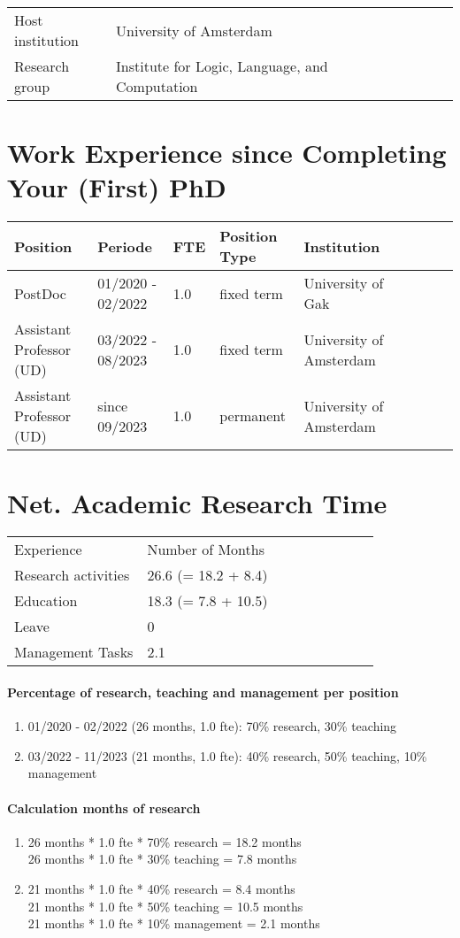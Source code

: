 \documentclass[a4paper,9.5pt,fleqn]{application}
\begin{document}
\begin{tabular}{lllllllll}
Host institution& University of Amsterdam\\
Research group& Institute for Logic, Language, and Computation
\end{tabular}

\section{Work Experience since Completing Your (First) PhD}

\begin{tabular}{lllllllll}
Position & Periode & FTE & Position Type & Institution\\ \hline
PostDoc & 01/2020 - 02/2022 & 1.0 & fixed term & University of Gak\\
Assistant Professor (UD) & 03/2022 - 08/2023 & 1.0 & fixed term & University of Amsterdam\\
Assistant Professor (UD) & since 09/2023 & 1.0 & permanent & University of Amsterdam
\end{tabular}


\section{Net. Academic Research Time}
\begin{tabular}{lllllllll}
Experience& Number of Months\\
Research activities & 26.6 (= 18.2 + 8.4)\\
Education & 18.3 (= 7.8 + 10.5)\\
Leave & 0 \\
Management Tasks & 2.1 \\
\end{tabular}

\paragraph{Percentage of research, teaching and management per position}
\begin{enumerate}
	\item 01/2020 - 02/2022 (26 months, 1.0 fte): 70\% research, 30\% teaching
	\item 03/2022 - 11/2023 (21 months, 1.0 fte): 40\% research, 50\% teaching, 10\% management
\end{enumerate}

\paragraph{Calculation months of research}
\begin{enumerate}
	\item 26 months * 1.0 fte * 70\% research = 18.2 months\\ 
	      26 months * 1.0 fte * 30\% teaching = 7.8 months
	\item 21 months * 1.0 fte * 40\% research = 8.4 months\\
	      21 months * 1.0 fte * 50\% teaching = 10.5 months\\
	      21 months * 1.0 fte * 10\% management = 2.1 months
\end{enumerate}
\end{document}
